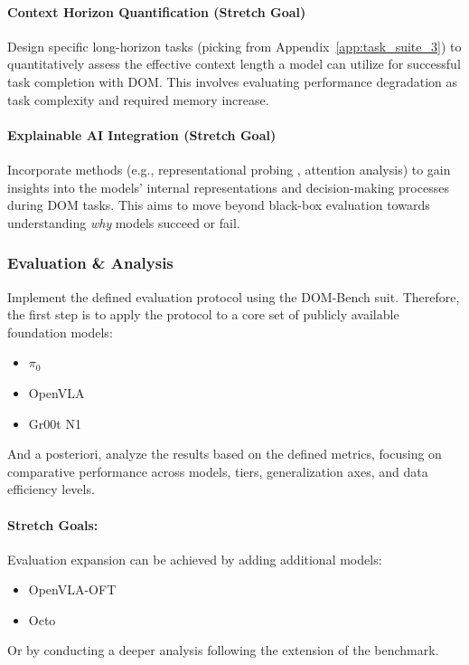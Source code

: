 \paragraph{\textbf{Context Horizon Quantification} (Stretch Goal)} Design specific long-horizon tasks (picking from Appendix~\ref{app:task_suite_3}) to quantitatively assess the effective context length a model can utilize for successful task completion with DOM. This involves evaluating performance degradation as task complexity and required memory increase.


\paragraph{\textbf{Explainable AI Integration} (Stretch Goal) } Incorporate methods (e.g., representational probing \cite{Probing-VLA}, attention analysis) to gain insights into the models' internal representations and decision-making processes during DOM tasks. This aims to move beyond black-box evaluation towards understanding \textit{why} models succeed or fail.


\subsubsection{Evaluation \& Analysis}
Implement the defined evaluation protocol using the DOM-Bench suit. Therefore, the first step is to apply the protocol to a core set of publicly available foundation models:
\begin{itemize}
    \item $\pi_0$ \cite{pi_zero}
    \item OpenVLA \cite{OpenVLA}
    \item Gr00t N1 \cite{Gr00tN1}
\end{itemize}
And a posteriori, analyze the results based on the defined metrics, focusing on comparative performance across models, tiers, generalization axes, and data efficiency levels.

\paragraph{Stretch Goals:}


Evaluation expansion can be achieved by adding additional models:
    \begin{itemize}
        \item OpenVLA-OFT \cite{OpenVLA-OFT}
        \item Octo \cite{Octo}
    \end{itemize}
Or by conducting a deeper analysis following the extension of the benchmark.


